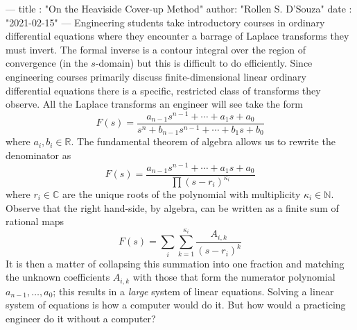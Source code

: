 ---
title :   "On the Heaviside Cover-up Method"
author:   "Rollen S. D'Souza"
date  :   "2021-02-15"
---
Engineering students take introductory courses in ordinary differential equations where they encounter a barrage of Laplace transforms they must invert.
The formal inverse is a contour integral over the region of convergence (in the \(s\)-domain) but this is difficult to do efficiently.
Since engineering courses primarily discuss finite-dimensional linear ordinary differential equations there is a specific, restricted class of transforms they observe.
All the Laplace transforms an engineer will see take the form
\[
  F(s) = \frac{a_{n-1} s^{n-1} + \cdots + a_1 s + a_0}{s^n + b_{n-1} s^{n-1} + \cdots + b_1 s + b_0}
\]
where \(a_i, b_i \in \mathbb{R}.\)
The fundamental theorem of algebra allows us to rewrite the denominator as
\[
  F(s) = \frac{a_{n-1} s^{n-1} + \cdots + a_1 s + a_0}{\prod (s - r_i)^{\kappa_i}}
\]
where \(r_i \in \mathbb{C}\) are the unique roots of the polynomial with multiplicity \(\kappa_i \in \mathbb{N}.\)
Observe that the right hand-side, by algebra, can be written as a finite sum of rational maps
\[
  F(s) = \sum_i \sum_{k = 1}^{\kappa_i} \frac{A_{i, k}}{(s - r_i)^k}
\]
It is then a matter of collapsing this summation into one fraction and matching the unknown coefficients \(A_{i, k}\) with those that form the numerator polynomial \(a_{n-1},\ldots, a_0\); this results in a \emph{large} system of linear equations.
Solving a linear system of equations is how a computer would do it.
But how would a practicing engineer do it without a computer?

